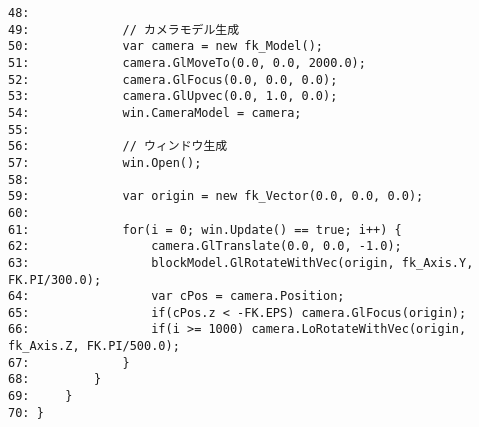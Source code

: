 \begin{breakbox}
\begin{small}
\begin{verbatim}
48: 
49:             // カメラモデル生成
50:             var camera = new fk_Model();
51:             camera.GlMoveTo(0.0, 0.0, 2000.0);
52:             camera.GlFocus(0.0, 0.0, 0.0);
53:             camera.GlUpvec(0.0, 1.0, 0.0);
54:             win.CameraModel = camera;
55: 
56:             // ウィンドウ生成
57:             win.Open();
58: 
59:             var origin = new fk_Vector(0.0, 0.0, 0.0);
60: 
61:             for(i = 0; win.Update() == true; i++) {
62:                 camera.GlTranslate(0.0, 0.0, -1.0);
63:                 blockModel.GlRotateWithVec(origin, fk_Axis.Y, FK.PI/300.0);
64:                 var cPos = camera.Position;
65:                 if(cPos.z < -FK.EPS) camera.GlFocus(origin);
66:                 if(i >= 1000) camera.LoRotateWithVec(origin, fk_Axis.Z, FK.PI/500.0);
67:             }
68:         }
69:     }
70: }
\end{verbatim}
\end{small}
\end{breakbox}
~
